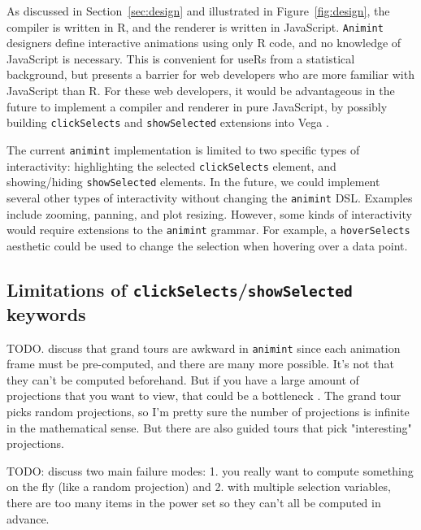 \documentclass[journal]{vgtc}\usepackage[]{graphicx}\usepackage[]{color}
\begin{document}
As discussed in Section~\ref{sec:design} and illustrated in
Figure~\ref{fig:design}, the compiler is written in R, and the
renderer is written in JavaScript.
\texttt{Animint} designers define interactive animations using only R code, and
no knowledge of JavaScript is necessary. This is convenient for useRs
from a statistical background, but presents a barrier for web
developers who are more familiar with JavaScript than R. For these web
developers, it would be advantageous in the future to implement a
compiler and renderer in pure JavaScript, by possibly building
\texttt{clickSelects} and \texttt{showSelected} extensions into Vega
\citep{vega}.

The current \texttt{animint} implementation is limited to two specific types of
interactivity: highlighting the selected \texttt{clickSelects}
element, and showing/hiding \texttt{showSelected} elements. In the
future, we could implement several other types of interactivity
without changing the \texttt{animint} DSL. Examples include zooming,
panning, and plot resizing. However, some
kinds of interactivity would require extensions to the \texttt{animint}
grammar. For example, a \texttt{hoverSelects} aesthetic
could be used to change the selection when hovering over a data point.

\subsection{Limitations of \texttt{clickSelects}/\texttt{showSelected} keywords}

TODO. discuss that grand tours are awkward in \texttt{animint} since each
animation frame must be pre-computed, and there are many more possible.
It's not that they can't be computed beforehand. But if you have a
large amount of projections that you want to view, that could be a
bottleneck \citep{tourr}. The grand tour picks random projections, so
I'm pretty sure the number of projections is infinite in the
mathematical sense. But there are also guided tours that pick
"interesting" projections.

TODO: discuss two main failure modes: 1. you really want to compute
something on the fly (like a random projection) and 2. with multiple
selection variables, there are too many items in the power set so they
can't all be computed in advance.
\end{document}
